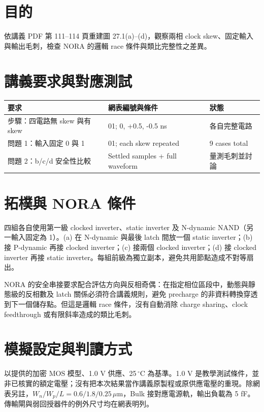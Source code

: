 \section{目的}

依講義 PDF 第 111--114 頁重建圖 27.1(a)--(d)，觀察兩相 clock skew、固定輸入與輸出毛刺，檢查 NORA 的邏輯 race 條件與類比完整性之差異。

\section{講義要求與對應測試}

\begin{center}
\small
\setlength{\tabcolsep}{4pt}
\begin{tabular}{p{.42\linewidth}p{.29\linewidth}p{.18\linewidth}}
\toprule
要求 & 網表編號與條件 & 狀態 \\
\midrule
步驟：四電路無 skew 與有 skew & 01; 0, +0.5, -0.5 ns & 各自完整電路 \\
問題 1：輸入固定 0 與 1 & 01; each skew repeated & 9 cases total \\
問題 2：b/c/d 安全性比較 & Settled samples + full waveform & 量測毛刺並討論 \\
\bottomrule
\end{tabular}
\end{center}

\section{拓樸與 NORA 條件}

四組各自使用第一級 clocked inverter、static inverter 及 N-dynamic NAND（另一輸入固定為 1）。(a) 在 N-dynamic 與最後 latch 間放一個 static inverter；(b) 接 P-dynamic 再接 clocked inverter；(c) 接兩個 clocked inverter；(d) 接 clocked inverter 再接 static inverter。每組前級為獨立副本，避免共用節點造成不對等扇出。

NORA 的安全串接要求配合評估方向與反相奇偶：在指定相位區段中，動態與靜態級的反相數及 latch 關係必須符合講義規則，避免 precharge 的非資料轉換穿透到下一個儲存點。但這是邏輯 race 條件，沒有自動消除 charge sharing、clock feedthrough 或有限斜率造成的類比毛刺。

\section{模擬設定與判讀方式}

以提供的加密 MOS 模型、1.0 V 供應、25\,$^\circ$C 為基準。1.0 V 是教學測試條件，並非已核實的額定電壓；沒有把本次結果當作講義原製程或原供應電壓的重現。除網表另註，$W_n/W_p/L=0.6/1.8/0.25\,\mu\mathrm m$，Bulk 接對應電源軌，輸出負載為 5 fF。傳輸閘與弱回授器件的例外尺寸均在網表明列。


